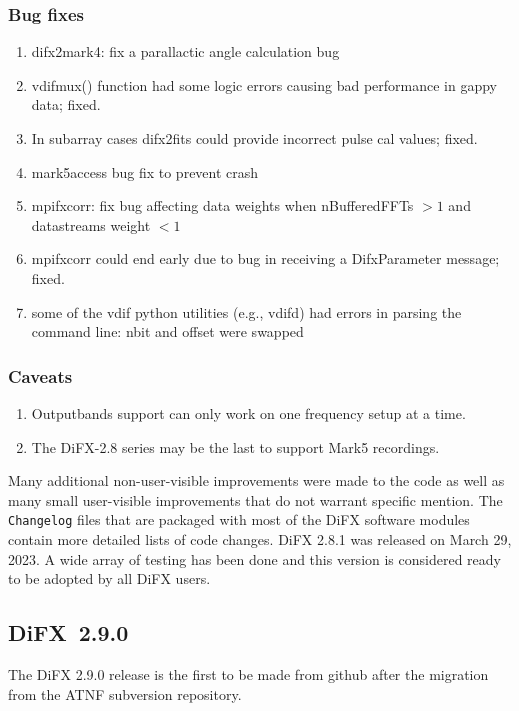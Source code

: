 \subsubsection{Bug fixes}
\begin{enumerate}
\item difx2mark4: fix a parallactic angle calculation bug
\item vdifmux() function had some logic errors causing bad performance in gappy data; fixed.
\item In subarray cases difx2fits could provide incorrect pulse cal values; fixed.
\item mark5access bug fix to prevent crash
\item mpifxcorr: fix bug affecting data weights when nBufferedFFTs $> 1$ and datastreams weight $< 1$
\item mpifxcorr could end early due to bug in receiving a DifxParameter message; fixed.
\item some of the vdif python utilities (e.g., vdifd) had errors in parsing the command line: nbit and offset were swapped
\end{enumerate}

\subsubsection{Caveats}
\begin{enumerate}
\item Outputbands support can only work on one frequency setup at a time.
\item The DiFX-2.8 series may be the last to support Mark5 recordings. 
\end{enumerate}

Many additional non-user-visible improvements were made to the code as well as many small user-visible improvements that do not warrant specific mention.
The {\tt Changelog} files that are packaged with most of the DiFX software modules contain more detailed lists of code changes.
DiFX 2.8.1 was released on March 29, 2023.
A wide array of testing has been done and this version is considered ready to be adopted by all DiFX users.

\subsection{DiFX~2.9.0}

The DiFX 2.9.0 release is the first to be made from github after the migration from the ATNF subversion repository.

